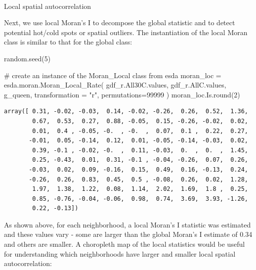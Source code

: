 \documentclass[
]{aft}
\makeatletter
\let\oldparagraph\paragraph
\renewcommand{\paragraph}{
    \@ifstar
      \xxxParagraphStar
      \xxxParagraphNoStar
  }
\newcommand{\xxxParagraphStar}[1]{\oldparagraph*{#1}\mbox{}}
\newcommand{\xxxParagraphNoStar}[1]{\oldparagraph{#1}\mbox{}}
\newenvironment{Shaded}{\begin{snugshade}}{\end{snugshade}}
\newcommand{\BuiltInTok}[1]{\textcolor[rgb]{0.00,0.23,0.31}{#1}}
\newcommand{\CommentTok}[1]{\textcolor[rgb]{0.37,0.37,0.37}{#1}}
\newcommand{\DecValTok}[1]{\textcolor[rgb]{0.68,0.00,0.00}{#1}}
\newcommand{\NormalTok}[1]{\textcolor[rgb]{0.00,0.23,0.31}{#1}}
\newcommand{\OperatorTok}[1]{\textcolor[rgb]{0.37,0.37,0.37}{#1}}
\newcommand{\StringTok}[1]{\textcolor[rgb]{0.13,0.47,0.30}{#1}}
\makeatother
\begin{document}
\paragraph{Local spatial
autocorrelation}\label{local-spatial-autocorrelation}

Next, we use local Moran's I to decompose the global statistic and to
detect potential hot/cold spots or spatial outliers. The instantiation
of the local Moran class is similar to that for the global class:

\begin{Shaded}
\begin{Highlighting}[]
\NormalTok{random.seed(}\DecValTok{5}\NormalTok{)}

\CommentTok{\# create an instance of the Moran\_Local class from esda}
\NormalTok{moran\_loc }\OperatorTok{=}\NormalTok{ esda.moran.Moran\_Local\_Rate(}
\NormalTok{  gdf\_r.All30C.values, }
\NormalTok{  gdf\_r.AllC.values, }
\NormalTok{  g\_queen, }
\NormalTok{  transformation }\OperatorTok{=} \StringTok{"r"}\NormalTok{,}
\NormalTok{  permutations}\OperatorTok{=}\DecValTok{99999}
\NormalTok{  )}
\NormalTok{moran\_loc.Is.}\BuiltInTok{round}\NormalTok{(}\DecValTok{2}\NormalTok{)}
\end{Highlighting}
\end{Shaded}

\begin{verbatim}
array([ 0.31, -0.02, -0.03,  0.14, -0.02, -0.26,  0.26,  0.52,  1.36,
        0.67,  0.53,  0.27,  0.88, -0.05,  0.15, -0.26, -0.02,  0.02,
        0.01,  0.4 , -0.05, -0.  , -0.  ,  0.07,  0.1 ,  0.22,  0.27,
       -0.01,  0.05, -0.14,  0.12,  0.01, -0.05, -0.14, -0.03,  0.02,
        0.39, -0.1 , -0.02, -0.  ,  0.11, -0.03,  0.  ,  0.  ,  1.45,
        0.25, -0.43,  0.01,  0.31, -0.1 , -0.04, -0.26,  0.07,  0.26,
       -0.03,  0.02,  0.09, -0.16,  0.15,  0.49,  0.16, -0.13,  0.24,
       -0.26,  0.26,  0.83,  0.45,  0.5 , -0.08,  0.26,  0.02,  1.28,
        1.97,  1.38,  1.22,  0.08,  1.14,  2.02,  1.69,  1.8 ,  0.25,
        0.85, -0.76, -0.04, -0.06,  0.98,  0.74,  3.69,  3.93, -1.26,
        0.22, -0.13])
\end{verbatim}

As shown above, for each neighborhood, a local Moran's I statistic was
estimated and these values vary - some are larger than the global
Moran's I estimate of 0.34 and others are smaller. A choropleth map of
the local statistics would be useful for understanding which
neighborhoods have larger and smaller local spatial autocorrelation:
\end{document}
